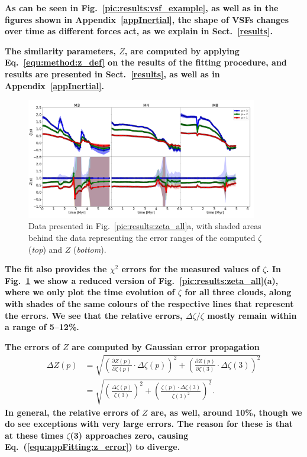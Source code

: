 \textbf{
As can be seen in Fig.~\ref{pic:results:vsf_example}, as well as in the figures shown in Appendix~\ref{appInertial}, the shape of VSFs changes over time as different forces act, as we explain in Sect.~\ref{results}. 
}

\textbf{
    The similarity parameters, $Z$, are computed by applying Eq.~\ref{equ:method:z_def} on the results of the fitting procedure, and results are presented in Sect.~\ref{results}, as well as in Appendix~\ref{appInertial}.
}

\begin{figure}
    \centering
    \includegraphics[width=0.9\textwidth]{error_vsf04_zeta_z.pdf}
    \caption{
        Data presented in Fig.~\ref{pic:results:zeta_all}a, with
        shaded areas behind the data representing the error ranges of the computed $\zeta$ (\textit{top}) and $Z$ (\textit{bottom}).  
    }
    \label{pic:appFitting:error_vsfhr04_zeta_z}
\end{figure}


\textbf{
The fit also provides the $\chi^2$ errors for the measured values of $\zeta$. 
In Fig.~\ref{pic:appFitting:error_vsfhr04_zeta_z} we show a reduced version of Fig.~\ref{pic:results:zeta_all}(a), where we only plot the time evolution of $\zeta$ for all three clouds, along with shades of the same colours of the respective lines that represent the errors.
We see that the relative errors, $\Delta \zeta / \zeta$ mostly remain within a range of 5--12\%. 
}

\textbf{
The errors of $Z$ are computed by Gaussian error propagation
}
\begin{align}\Delta Z(p) &= \sqrt{ \left( \frac{\partial Z(p)}{\partial \zeta(p)} \cdot \Delta\zeta(p) \right)^2 + \left( \frac{\partial Z(p)}{\partial \zeta(3)} \cdot \Delta\zeta(3) \right)^2 } \\
        &= \sqrt{ \left( \frac{\Delta\zeta(p)}{\zeta(3)} \right)^2 + \left( \frac{ \zeta(p) \cdot \Delta\zeta(3)}{\zeta(3)^2} \right)^2 }.
        \label{equ:appFitting:z_error}
\end{align}
\textbf{
\noindent In general, the relative errors of $Z$ are, as well, around 10\%, though we do see exceptions with very large errors. 
The reason for these is that at these times $\zeta$(3) approaches zero, causing Eq.~(\ref{equ:appFitting:z_error}) to diverge.
}



\endinput
